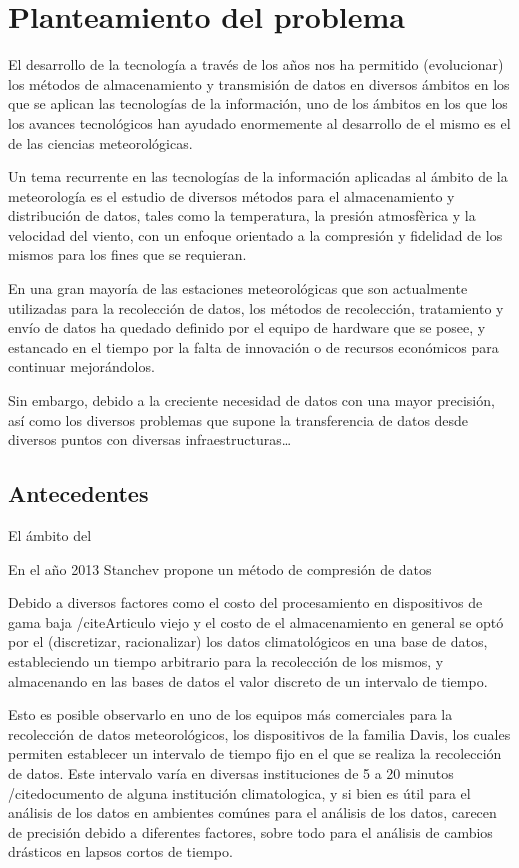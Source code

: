 \section{Planteamiento del problema}

El desarrollo de la tecnología a través de los años nos ha permitido (evolucionar) los métodos de almacenamiento y transmisión de datos en diversos ámbitos en los que se aplican las tecnologías de la información, uno de los ámbitos en los que los los avances tecnológicos han ayudado enormemente al desarrollo de el mismo es el de las ciencias meteorológicas.

Un tema recurrente en las tecnologías de la información aplicadas al ámbito de la meteorología es el estudio de diversos métodos para el almacenamiento y distribución de datos, tales como la temperatura, la presión atmosfèrica y la velocidad del viento, con un enfoque orientado a la compresión y fidelidad de los mismos para los fines que se requieran.

En una gran mayoría de las estaciones meteorológicas que son actualmente utilizadas para la recolección de datos, los métodos de recolección, tratamiento y envío de datos ha quedado definido por el equipo de hardware que se posee, y estancado en el tiempo por la falta de innovación o de recursos económicos para continuar mejorándolos.

Sin embargo, debido a la creciente necesidad de datos con una mayor precisión, así como los diversos problemas que supone la transferencia de datos desde diversos puntos con diversas infraestructuras\dots


\subsection{Antecedentes}

El ámbito del

En el año 2013 Stanchev \cite{Improved_Stanchev} propone un método de compresión de datos


Debido a diversos factores como el costo del procesamiento en dispositivos de gama baja /cite{Articulo viejo} y el costo de el almacenamiento en general \cite{Marshall_1994} se optó por el (discretizar, racionalizar) los datos climatológicos en una base de datos, estableciendo un tiempo arbitrario para la recolección de los mismos, y almacenando en las bases de datos el valor discreto de un intervalo de tiempo.

Esto es posible observarlo en uno de los equipos más comerciales para la recolección de datos meteorológicos, los dispositivos de la familia Davis, los cuales permiten establecer un intervalo de tiempo fijo en el que se realiza la recolección de datos. Este intervalo varía en diversas instituciones de 5 a 20 minutos /cite{documento de alguna institución climatologica}, y si bien es útil para el análisis de los datos en ambientes comúnes para el análisis de los datos, carecen de precisión debido a diferentes factores, sobre todo para el análisis de cambios drásticos en lapsos cortos de tiempo.

